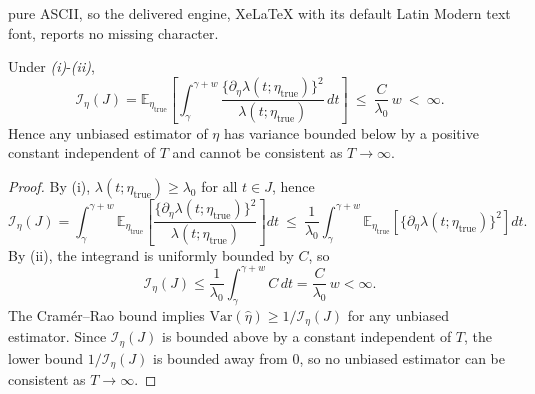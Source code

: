 \documentclass[10pt,a4paper]{amsart}
\newcommand{\E}{\mathbb{E}}
\newcommand{\Var}{\mathrm{Var}}
\begin{document}
pure ASCII, so the delivered engine, XeLaTeX with its default Latin Modern text font, reports no missing character.
    \begin{proposition}
\label{prop:bounded-info}
Under \emph{(i)}-\emph{(ii)},
\[
\mathcal I_\eta(J)
=\E_{\eta_{\mathrm{true}}}\left[\int_{\gamma}^{\gamma+w}\frac{\{\partial_\eta \lambda(t;\eta_{\mathrm{true}})\}^2}{\lambda(t;\eta_{\mathrm{true}})}\,dt\right]
\ \le\ \frac{C}{\lambda_0}\,w
\ <\ \infty.
\]
Hence any unbiased estimator of $\eta$ has variance bounded below by a positive constant independent of $T$ and cannot be consistent as $T\to\infty$.
\end{proposition}

\begin{proof}
By (i), $\lambda(t;\eta_{\mathrm{true}})\ge \lambda_0$ for all $t\in J$, hence
\[
\mathcal I_\eta(J)
=\int_{\gamma}^{\gamma+w}\E_{\eta_{\mathrm{true}}}\!\left[\frac{\{\partial_\eta \lambda(t;\eta_{\mathrm{true}})\}^2}{\lambda(t;\eta_{\mathrm{true}})}\right]dt
\ \le\ \frac{1}{\lambda_0}\int_{\gamma}^{\gamma+w}\E_{\eta_{\mathrm{true}}}\!\left[\{\partial_\eta \lambda(t;\eta_{\mathrm{true}})\}^2\right]dt.
\]
By (ii), the integrand is uniformly bounded by $C$, so
\[
\mathcal I_\eta(J)\le \frac{1}{\lambda_0}\int_{\gamma}^{\gamma+w} C\,dt
=\frac{C}{\lambda_0}\,w
<\infty.
\]
The Cram\'er--Rao bound implies $\Var(\widehat\eta)\ge 1/\mathcal I_\eta(J)$ for any unbiased estimator. Since $\mathcal I_\eta(J)$ is bounded above by a constant independent of $T$, the lower bound $1/\mathcal I_\eta(J)$ is bounded away from $0$, so no unbiased estimator can be consistent as $T\to\infty$.
\end{proof}
\end{document}
